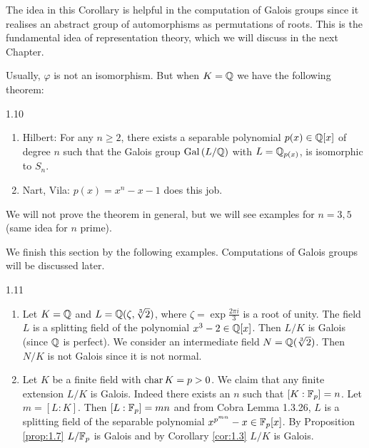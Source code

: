 \documentclass[twoside = false,	%
		headsepline,		%
		parskip = true,
		]{scrbook}						%
\begin{document}
        The idea in this Corollary is helpful in the computation of Galois groups since it realises an abstract group of automorphisms as permutations of roots. This is the fundamental idea of representation theory, which we will discuss in the next Chapter.
        
        Usually, $\varphi$ is not an isomorphism. But when $K = \mathbb Q$  we have the following theorem:
        
        \begin{theorem}{}{1.10}
        \begin{enumerate}
            \item Hilbert: For any $n \geq 2$, there exists a separable polynomial $p(x) \in \mathbb Q[x]$ of degree $n$ such that the Galois group $\mathrm{Gal}\left( L/\mathbb Q\right)$ with $L = \mathbb Q_{p(x)}$, is isomorphic to $S_n$.
            \item Nart, Vila: $p(x) = x^n - x -1$ does this job.
        \end{enumerate}
        \end{theorem}
        
        We will not prove the theorem in general, but we will see examples for $n=3,5$ (same idea for $n$ prime).
        
        We finish this section by the following examples. Computations of Galois groups will be discussed later.
        
        \begin{example}{}{1.11}
            \begin{enumerate}
                \item Let $K=\mathbb Q$ and $L = \mathbb Q(\zeta,\sqrt[3]{2})$, where $\zeta = \exp{\frac{2\pi i}{3}}$ is a root of unity. The field $L$ is a splitting field of the polynomial $x^3-2 \in \mathbb Q[x]$. Then $L/K$ is Galois (since $\mathbb Q$ is perfect). We consider an intermediate field $N = \mathbb Q(\sqrt[3]{2})$. Then $N/K$ is not Galois since it is not normal.
                \item Let $K$ be a finite field with $\mathrm{char} \, K = p > 0$. We claim that any finite extension $L/K$ is Galois. Indeed there exists an $n$ such that $[K:\mathbb F_p] = n$. Let $m = [L:K]$. Then $[L:\mathbb F_p] = mn$ and from Cobra \cite{Cobra} Lemma 1.3.26, $L$ is a splitting field of the separable polynomial $x^{p^{mn}}-x\in \mathbb F_p[x]$. By Proposition \ref{prop:1.7} $L/\mathbb F_p$ is Galois and by Corollary \ref{cor:1.3} $L/K$ is Galois. %
            \end{enumerate}
        \end{example}
        
\end{document}
